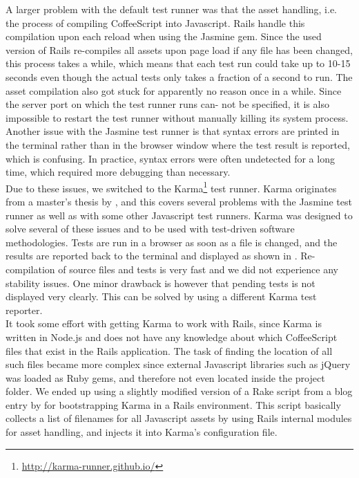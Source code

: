 A larger problem with the default test runner was that the asset
handling, i.e. the process of compiling CoffeeScript into Javascript.
Rails handle this compilation upon each reload when using the Jasmine
gem. Since the used version of Rails re-compiles all assets upon page
load if any file has been changed, this process takes a while, which
means that each test run could take up to 10-15 seconds even though the
actual tests only takes a fraction of a second to run. The asset
compilation also got stuck for apparently no reason once in a while.
Since the server port on which the test runner runs can- not be
specified, it is also impossible to restart the test runner without
manually killing its system process.\\

Another issue with the Jasmine test runner is that syntax errors are
printed in the terminal rather than in the browser window where the test
result is reported, which is confusing. In practice, syntax errors were
often undetected for a long time, which required more debugging than
necessary.\\

Due to these issues, we switched to the Karma\footnote{
\url{http://karma-runner.github.io/}} test runner. Karma originates from
a master's thesis by \citet{article:karma}, and this covers several
problems with the Jasmine test runner as well as with some other
Javascript test runners. Karma was designed to solve several of these
issues and to be used with test-driven software methodologies. Tests are
run in a browser as soon as a file is changed, and the results are
reported back to the terminal and displayed as shown in
. Re-compilation of source files and tests is
very fast and we did not experience any stability issues. One minor
drawback is however that pending tests is not displayed very clearly.
This can be solved by using a different Karma test reporter.\\

It took some effort with getting Karma to work with Rails, since Karma
is written in Node.js and does not have any knowledge about which
CoffeeScript files that exist in the Rails application. The task of
finding the location of all such files became more complex since
external Javascript libraries such as jQuery was loaded as Ruby gems,
and therefore not even located inside the project folder. We ended up
using a slightly modified version of a Rake script from a blog entry by
\citet{web:saunier_angular} for bootstrapping Karma in a Rails
environment. This script basically collects a list of filenames for all
Javascript assets by using Rails internal modules for asset handling,
and injects it into Karma's configuration file.\\

